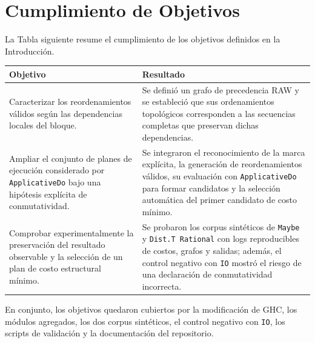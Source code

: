 
\section{Cumplimiento de Objetivos}

La Tabla siguiente resume el cumplimiento de los objetivos definidos en la Introducción.

\begin{center}
\begin{tabular}{>{\raggedright\arraybackslash}p{}>{\raggedright\arraybackslash}p{}}
\hline
Objetivo & Resultado \\
\hline
Caracterizar los reordenamientos válidos según las dependencias locales del bloque. & Se definió un grafo de precedencia RAW y se estableció que sus ordenamientos topológicos corresponden a las secuencias completas que preservan dichas dependencias. \\
Ampliar el conjunto de planes de ejecución considerado por \texttt{ApplicativeDo} bajo una hipótesis explícita de conmutatividad. & Se integraron el reconocimiento de la marca explícita, la generación de reordenamientos válidos, su evaluación con \texttt{ApplicativeDo} para formar candidatos y la selección automática del primer candidato de costo mínimo. \\
Comprobar experimentalmente la preservación del resultado observable y la selección de un plan de costo estructural mínimo. & Se probaron los corpus sintéticos de \texttt{Maybe} y \texttt{Dist.T Rational} con logs reproducibles de costos, grafos y salidas; además, el control negativo con \texttt{IO} mostró el riesgo de una declaración de conmutatividad incorrecta. \\
\hline
\end{tabular}
\end{center}

En conjunto, los objetivos quedaron cubiertos por la modificación de \textsf{GHC}, los módulos agregados, los dos corpus sintéticos, el control negativo con \texttt{IO}, los scripts de validación y la documentación del repositorio.
